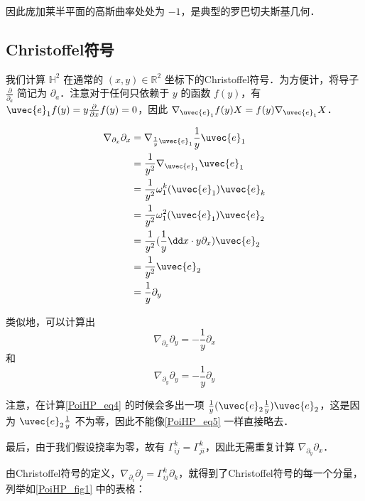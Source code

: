 因此庞加莱半平面的高斯曲率处处为 $-1$，是典型的罗巴切夫斯基几何．




\subsection{Christoffel符号}

我们计算 $\mathbb{H}^2$ 在通常的 $(x, y)\in\mathbb{R}^2$ 坐标下的Christoffel符号．为方便计，将导子 $\frac{\partial}{\partial_a}$ 简记为 $\partial_a$．注意对于任何只依赖于 $y$ 的函数 $f(y)$，有 $\uvec{e}_1f(y)=y\frac{\partial}{\partial x}f(y)=0$，因此 $\nabla_{\uvec{e}_1}f(y)X=f(y)\nabla_{\uvec{e}_1}X$．

\begin{equation}\label{PoiHP_eq5}
\begin{aligned}
\nabla_{\partial_x}\partial_x&=\nabla_{\frac{1}{y}\uvec{e}_1}\frac{1}{y}\uvec{e}_1\\
&=\frac{1}{y^2}\nabla_{\uvec{e}_1}\uvec{e}_1\\
&=\frac{1}{y^2}\omega^k_1(\uvec{e}_1)\uvec{e}_k\\
&=\frac{1}{y^2}\omega^2_1(\uvec{e}_1)\uvec{e}_2\\
&=\frac{1}{y^2}(\frac{1}{y}\dd x\cdot y\partial_x)\uvec{e}_2\\
&=\frac{1}{y^2}\uvec{e}_2\\
&=\frac{1}{y}\partial_y
\end{aligned}
\end{equation}

类似地，可以计算出
\begin{equation}
\nabla_{\partial_x}\partial_y=-\frac{1}{y}\partial_x
\end{equation}
和
\begin{equation}\label{PoiHP_eq4}
\nabla_{\partial_y}\partial_y=-\frac{1}{y}\partial_y
\end{equation}

注意，在计算\autoref{PoiHP_eq4} 的时候会多出一项 $\frac{1}{y}(\uvec{e}_2\frac{1}{y})\uvec{e}_2$，这是因为 $\uvec{e}_2\frac{1}{y}$ 不为零，因此不能像\autoref{PoiHP_eq5} 一样直接略去．

最后，由于我们假设挠率为零，故有 $\Gamma^k_{ij}=\Gamma^k_{ji}$，因此无需重复计算 $\nabla_{\partial_y}\partial_x$．

由Christoffel符号的定义，$\nabla_{\partial_i}\partial_j=\Gamma^k_{ij}\partial_k$，就得到了Christoffel符号的每一个分量，列举如\autoref{PoiHP_fig1} 中的表格：

